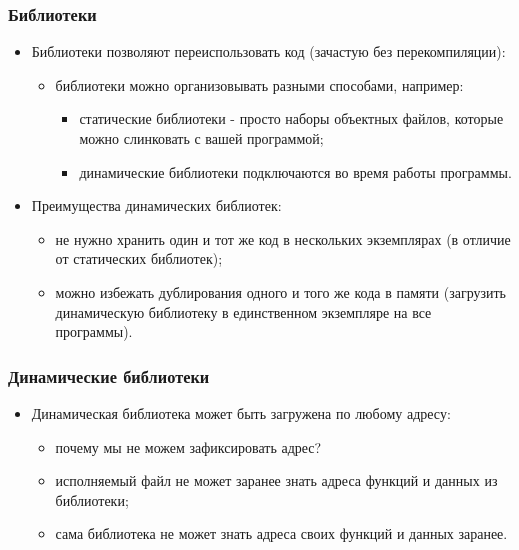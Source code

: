 \begin{frame}
\frametitle{Библиотеки}
\begin{itemize}
  \item Библиотеки позволяют переиспользовать код (зачастую без перекомпиляции):
  \begin{itemize}
    \item библиотеки можно организовывать разными способами, например:
    \begin{itemize}
      \item статические библиотеки - просто наборы объектных файлов, которые
      можно слинковать с вашей программой;
      \item динамические библиотеки подключаются во время работы программы.
    \end{itemize}
  \end{itemize}
  \item Преимущества динамических библиотек:
  \begin{itemize}
    \item не нужно хранить один и тот же код в нескольких экземплярах (в отличие
    от статических библиотек);
    \item можно избежать дублирования одного и того же кода в памяти (загрузить
    динамическую библиотеку в единственном экземпляре на все программы).
  \end{itemize}
\end{itemize}
\end{frame}

\begin{frame}
\frametitle{Динамические библиотеки}
\begin{itemize}
  \item Динамическая библиотека может быть загружена по любому адресу:
  \begin{itemize}
    \item почему мы не можем зафиксировать адрес?
    \item исполняемый файл не может заранее знать адреса функций и данных из
    библиотеки;
    \item сама библиотека не может знать адреса своих функций и данных заранее.
  \end{itemize}
\end{itemize}
\end{frame}

